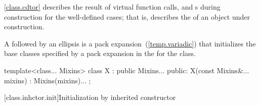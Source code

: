 \pnum
\begin{note}
\ref{class.cdtor} describes the result of virtual function calls,
and
s
during construction for the well-defined cases;
that is, describes the
of an object under construction.
\end{note}

\pnum
{}%
A  followed by an ellipsis is
a pack expansion~(\ref{temp.variadic}) that initializes the base
classes specified by a pack expansion in the 
for the class. \begin{example}

\begin{codeblock}
template<class... Mixins>
class X : public Mixins... {
public:
  X(const Mixins&... mixins) : Mixins(mixins)... { }
};
\end{codeblock}

\end{example}

[class.inhctor.init]{Initialization by inherited constructor}%

